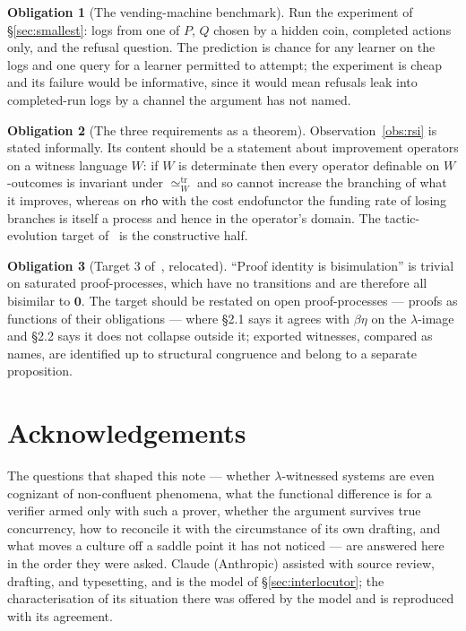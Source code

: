 \documentclass[11pt]{article}
\theoremstyle{plain}
\theoremstyle{definition}
\newtheorem{obligation}{Obligation}
\theoremstyle{remark}
\newcommand{\rhoc}{\textsf{rho}}
\newcommand{\treq}[1]{\simeq^{\mathrm{tr}}_{#1}}
\newcommand{\nil}{\mathbf{0}}
\begin{document}
\begin{obligation}[The vending-machine benchmark]
Run the experiment of \S\ref{sec:smallest}: logs from one of $P$, $Q$ chosen
by a hidden coin, completed actions only, and the refusal question. The
prediction is chance for any learner on the logs and one query for a learner
permitted to attempt; the experiment is cheap and its failure would be
informative, since it would mean refusals leak into completed-run logs by a
channel the argument has not named.
\end{obligation}

\begin{obligation}[The three requirements as a theorem]
Observation~\ref{obs:rsi} is stated informally. Its content should be a
statement about improvement operators on a witness language $W$: if $W$ is
determinate then every operator definable on $W$-outcomes is invariant under
$\treq{W}$ and so cannot increase the branching of what it improves, whereas
on $\rhoc$ with the cost endofunctor the funding rate of losing branches is
itself a process and hence in the operator's domain. The tactic-evolution
target of~\cite{ProofSearch} is the constructive half.
\end{obligation}

\begin{obligation}[Target 3 of~\cite{ProofSearch}, relocated]
``Proof identity is bisimulation'' is trivial on saturated proof-processes,
which have no transitions and are therefore all bisimilar to $\nil$. The
target should be restated on open proof-processes --- proofs as functions of
their obligations --- where \S2.1 says it agrees with $\beta\eta$ on the
$\lambda$-image and \S2.2 says it does not collapse outside it; exported
witnesses, compared as names, are identified up to structural congruence and
belong to a separate proposition.
\end{obligation}

\section*{Acknowledgements}

The questions that shaped this note --- whether $\lambda$-witnessed systems
are even cognizant of non-confluent phenomena, what the functional difference
is for a verifier armed only with such a prover, whether the argument survives
true concurrency, how to reconcile it with the circumstance of its own
drafting, and what moves a culture off a saddle point it has not noticed ---
are answered here in the order they were asked. Claude (Anthropic) assisted
with source review, drafting, and typesetting, and is the model of
\S\ref{sec:interlocutor}; the characterisation of its situation there was
offered by the model and is reproduced with its agreement.
\end{document}
